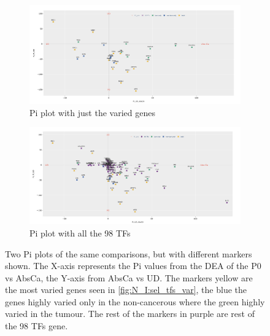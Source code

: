 \begin{figure}[!h]
    \captionsetup[subfigure]{justification=Centering}
\begin{subfigure}[!t]{1.0\textwidth}
    \includegraphics[width=1.0\textwidth,height=1.0\textheight,keepaspectratio]{Sections/Network_I/Resources/selective_pruning/sel_tfs_pi_1_v2.png}
    
    \caption{Pi plot with just the varied genes}
    
    \label{fig:N_I:pi_sel_tfs_var}
\end{subfigure}\hspace{\fill} %
\begin{subfigure}[!t]{1.0\textwidth}
    \includegraphics[width=1.0\textwidth,height=1.0\textheight,keepaspectratio]{Sections/Network_I/Resources/selective_pruning/sel_tfs_pi_all_v2.png}
    
    \caption{Pi plot with all the 98 TFs}
    
    \label{fig:N_I:pi_sel_tfs_all}
\end{subfigure}\hspace{\fill} %

    \caption{Two Pi plots of the same comparisons, but with different markers shown. The X-axis represents the Pi values from the DEA of the P0 vs AbsCa, the Y-axis from AbsCa vs UD. The markers yellow are the most varied genes seen in \cref{fig:N_I:sel_tfs_var}, the blue the genes highly varied only in the non-cancerous where the green highly varied in the tumour. The rest of the markers in purple are rest of the 98 TFs gene.}
    
    \label{fig:N_I:pi_sel_tfs}
\end{figure}

